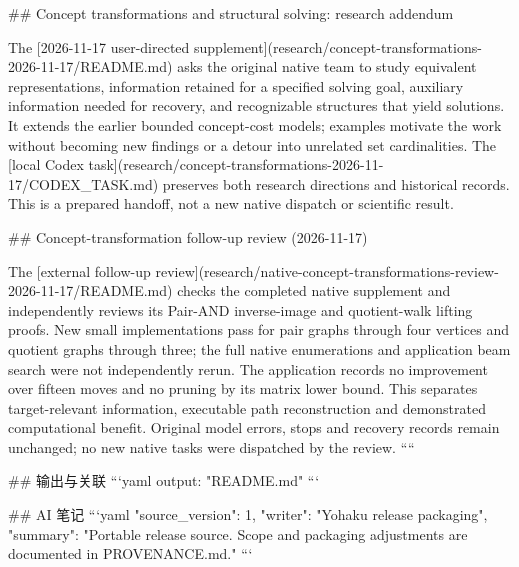 ## Concept transformations and structural solving: research addendum

The [2026-11-17 user-directed supplement](research/concept-transformations-2026-11-17/README.md) asks the original native team to study equivalent representations, information retained for a specified solving goal, auxiliary information needed for recovery, and recognizable structures that yield solutions. It extends the earlier bounded concept-cost models; examples motivate the work without becoming new findings or a detour into unrelated set cardinalities. The [local Codex task](research/concept-transformations-2026-11-17/CODEX_TASK.md) preserves both research directions and historical records. This is a prepared handoff, not a new native dispatch or scientific result.

## Concept-transformation follow-up review (2026-11-17)

The [external follow-up review](research/native-concept-transformations-review-2026-11-17/README.md) checks the completed native supplement and independently reviews its Pair-AND inverse-image and quotient-walk lifting proofs. New small implementations pass for pair graphs through four vertices and quotient graphs through three; the full native enumerations and application beam search were not independently rerun. The application records no improvement over fifteen moves and no pruning by its matrix lower bound. This separates target-relevant information, executable path reconstruction and demonstrated computational benefit. Original model errors, stops and recovery records remain unchanged; no new native tasks were dispatched by the review.
````

## 输出与关联
```yaml
output: "README.md"
```

## AI 笔记
```yaml
{"source_version": 1, "writer": "Yohaku release packaging", "summary": "Portable release source. Scope and packaging adjustments are documented in PROVENANCE.md."}
```
